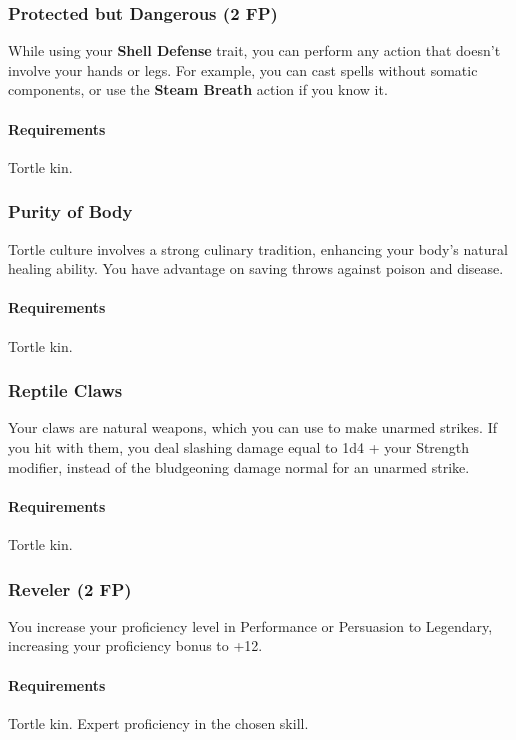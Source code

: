     \subsubsection{Protected but Dangerous (2 FP)} \label{feat::protectedbutdangerous}
        While using your \textbf{Shell Defense} trait, you can perform any action that doesn't involve your hands or legs.
        For example, you can cast spells without somatic components, or use the \textbf{Steam Breath} action if you know it.
        \paragraph{Requirements} Tortle kin.
    \subsubsection{Purity of Body} \label{feat::purityofbody}
        Tortle culture involves a strong culinary tradition, enhancing your body's natural healing ability.
        You have advantage on saving throws against poison and disease.
        \paragraph{Requirements} Tortle kin.
    \subsubsection{Reptile Claws} \label{feat::reptileclaws}
        Your claws are natural weapons, which you can use to make unarmed strikes.
        If you hit with them, you deal slashing damage equal to 1d4 + your Strength modifier, instead of the bludgeoning damage normal for an unarmed strike.
        \paragraph{Requirements} Tortle kin.
    \subsubsection{Reveler (2 FP)} \label{feat::reveler}
        You increase your proficiency level in Performance or Persuasion to Legendary, increasing your proficiency bonus to +12.
        \paragraph{Requirements} Tortle kin. Expert proficiency in the chosen skill.
